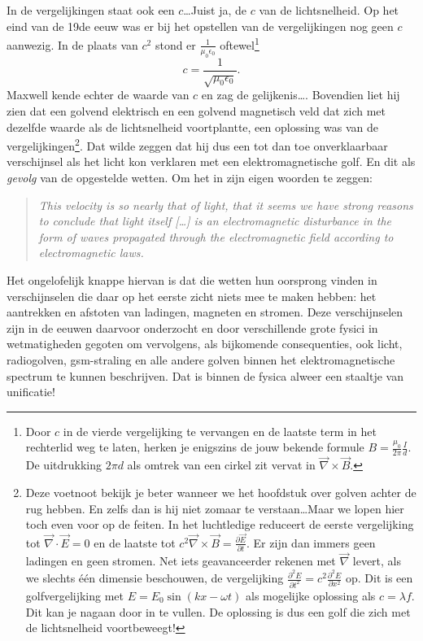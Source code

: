 \documentclass{ximera}
\begin{document}
	In de vergelijkingen staat ook een $c$\ldots Juist ja, de $c$ van de lichtsnelheid. Op het eind van de 19de eeuw was er bij het opstellen van de vergelijkingen nog geen $c$ aanwezig. In de plaats van $c^2$ stond er $\frac{1}{\mu_0\epsilon_0}$ oftewel\footnote{Door $c$ in de vierde vergelijking te vervangen en de laatste term in het rechterlid weg te laten, herken je enigszins de jouw bekende formule $B=\frac{\mu_0}{2\pi}\frac{I}{d}$. De uitdrukking $2\pi d$ als omtrek van een cirkel zit vervat in $\vec{\nabla}\times\vec{B}$.}
	\begin{equation}
		c=\frac{1}{\sqrt{\mu_0\epsilon_0}}.
	\end{equation}
	Maxwell kende echter de waarde van $c$ en zag de gelijkenis\ldots. Bovendien liet hij zien dat een golvend elektrisch en een golvend magnetisch veld dat zich met dezelfde waarde als de lichtsnelheid voortplantte, een oplossing was van de vergelijkingen\footnote{Deze voetnoot bekijk je beter wanneer we het hoofdstuk over golven achter de rug hebben. En zelfs dan is hij niet zomaar te verstaan\ldots Maar we lopen hier toch even voor op de feiten. In het luchtledige reduceert de eerste vergelijking tot $\vec{\nabla}\cdot\vec{E}=0$ en de laatste tot $c^2\vec{\nabla}\times\vec{B}=\frac{\partial\vec{E}}{\partial t}$. Er zijn dan immers geen ladingen en geen stromen. Net iets geavanceerder rekenen met $\vec{\nabla}$ levert, als we slechts \'e\'en dimensie beschouwen, de vergelijking $\frac{\partial^2E}{\partial t^2}=c^2\frac{\partial^2E}{\partial x^2}$ op. Dit is een golfvergelijking met $E=E_0\sin(kx -\omega t)$ als mogelijke oplossing als $c=\lambda f$. Dit kan je nagaan door in te vullen. De oplossing is dus een golf die zich met de lichtsnelheid voortbeweegt!}. Dat wilde zeggen dat hij dus een tot dan toe onverklaarbaar verschijnsel als het licht kon verklaren met een elektromagnetische golf. En dit als \emph{gevolg} van de opgestelde wetten. Om het in zijn eigen woorden te zeggen:
	\begin{quotation}
	\emph{This velocity is so nearly that of light, that it seems we have strong reasons to conclude that light itself [\ldots] is an electromagnetic disturbance in the form of waves propagated through the electromagnetic field according to electromagnetic laws.}
	\end{quotation}
	Het ongelofelijk knappe hiervan is dat die wetten hun oorsprong vinden in verschijnselen die daar op het eerste zicht niets mee te maken hebben: het aantrekken en afstoten van ladingen, magneten en stromen. Deze verschijnselen zijn in de eeuwen daarvoor onderzocht en door verschillende grote fysici in wetmatigheden gegoten om vervolgens, als bijkomende consequenties, ook licht, radiogolven, gsm-straling en alle andere golven binnen het elektromagnetische spectrum te kunnen beschrijven. Dat is binnen de fysica alweer een staaltje van unificatie!
	
	
\end{document}
